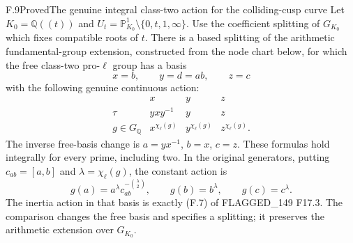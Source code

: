 \begin{statement}{F.9}{Proved}{The genuine integral class-two action for the colliding-cusp curve}
Let $K_0=\mathbb Q((t))$ and
$U_t=\mathbb P^1_{K_0}\setminus\{0,t,1,\infty\}$.
Use the coefficient splitting of $G_{K_0}$ which fixes
compatible roots of $t$.  There is a based splitting
of the arithmetic fundamental-group extension,
constructed from the node chart below, for which
the free class-two pro-$\ell$ group has a basis
\[
                 x=b,\qquad y=d=ab,\qquad z=c
                                                               \tag{F.9.1}
\]
with the following genuine continuous action:
\[
 \begin{array}{c|ccc}
       &x&y&z\\ \hline
 \tau&yxy^{-1}&y&z\\
 g\in G_{\mathbb Q}&x^{\chi_\ell(g)}&y^{\chi_\ell(g)}
                                         &z^{\chi_\ell(g)}.
 \end{array}                                                 \tag{F.9.2}
\]
The inverse free-basis change is
$a=yx^{-1}$, $b=x$, $c=z$.
These formulas hold integrally for every prime,
including two.  In the original generators, putting
$c_{ab}=[a,b]$ and $\lambda=\chi_\ell(g)$, the constant
action is
\[
 g(a)=a^\lambda c_{ab}^{-\binom\lambda2},\qquad
 g(b)=b^\lambda,\qquad g(c)=c^\lambda .                    \tag{F.9.3}
\]
The inertia action in that basis is exactly (F.7)
of FLAGGED\_149 F17.3.  The comparison changes the
free basis and specifies a splitting; it preserves
the arithmetic extension over $G_{K_0}$.
\end{statement}
